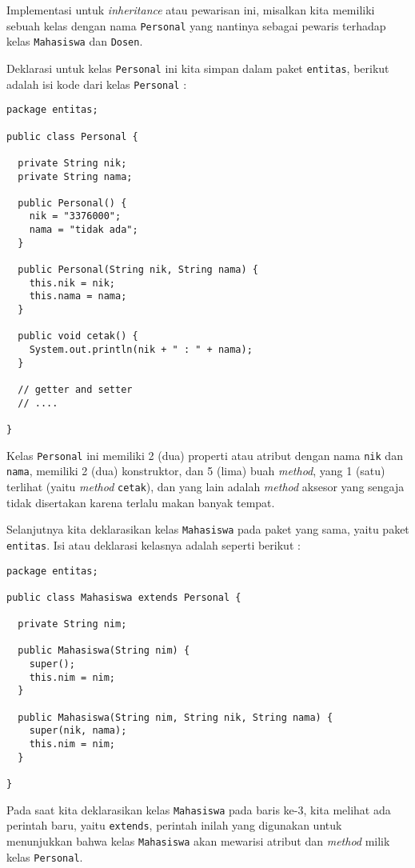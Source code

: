 Implementasi untuk \textit{inheritance} atau pewarisan ini, misalkan kita memiliki sebuah kelas dengan nama \texttt{Personal} yang nantinya sebagai pewaris terhadap kelas \texttt{Mahasiswa} dan \texttt{Dosen}. 

Deklarasi untuk kelas \texttt{Personal} ini kita simpan dalam paket \texttt{entitas}, berikut adalah isi kode dari kelas \texttt{Personal} :

\begin{lstlisting}
package entitas;

public class Personal {

  private String nik;
  private String nama;
  
  public Personal() {
    nik = "3376000";
    nama = "tidak ada";
  }
  
  public Personal(String nik, String nama) {
    this.nik = nik;
    this.nama = nama;
  }
  
  public void cetak() {
    System.out.println(nik + " : " + nama);
  }
  
  // getter and setter
  // .... 

}
\end{lstlisting}

Kelas \texttt{Personal} ini memiliki 2 (dua) properti atau atribut dengan nama \texttt{nik} dan \texttt{nama}, memiliki 2 (dua) konstruktor, dan 5 (lima) buah \textit{method}, yang 1 (satu) terlihat (yaitu \textit{method} \texttt{cetak}), dan yang lain adalah \textit{method} aksesor yang sengaja tidak disertakan karena terlalu makan banyak tempat.

Selanjutnya kita deklarasikan kelas \texttt{Mahasiswa} pada paket yang sama, yaitu paket \texttt{entitas}. Isi atau deklarasi kelasnya adalah seperti berikut :

\begin{lstlisting}
package entitas;

public class Mahasiswa extends Personal {
  
  private String nim;
  
  public Mahasiswa(String nim) {
    super();
    this.nim = nim;
  }
  
  public Mahasiswa(String nim, String nik, String nama) {
    super(nik, nama);
    this.nim = nim;
  }
  
}
\end{lstlisting}

Pada saat kita deklarasikan kelas \texttt{Mahasiswa} pada baris ke-3, kita melihat ada perintah baru, yaitu \texttt{extends}, perintah inilah yang digunakan untuk menunjukkan bahwa kelas \texttt{Mahasiswa} akan mewarisi atribut dan \textit{method} milik kelas \texttt{Personal}.

